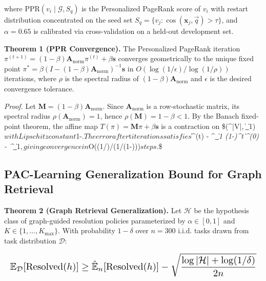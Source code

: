 \documentclass[10pt,journal,compsoc,twocolumn]{IEEEtran}
\begin{document}
where $\text{PPR}(v_i \mid \mathcal{G}, S_q)$ is the Personalized PageRank score of $v_i$ with restart distribution concentrated on the seed set $S_q = \{v_j : \cos(\mathbf{x}_j, \vec{q}) > \tau\}$, and $\alpha = 0.65$ is calibrated via cross-validation on a held-out development set.

\textbf{Theorem 1 (PPR Convergence).} The Personalized PageRank iteration $\pi^{(t+1)} = (1-\beta) \mathbf{A}_{\text{norm}} \pi^{(t)} + \beta \mathbf{s}$ converges geometrically to the unique fixed point $\pi^* = \beta(I - (1-\beta)\mathbf{A}_{\text{norm}})^{-1}\mathbf{s}$ in $O(\log(1/\epsilon) / \log(1/\rho))$ iterations, where $\rho$ is the spectral radius of $(1-\beta)\mathbf{A}_{\text{norm}}$ and $\epsilon$ is the desired convergence tolerance.

\textit{Proof.} Let $\mathbf{M} = (1-\beta)\mathbf{A}_{\text{norm}}$. Since $\mathbf{A}_{\text{norm}}$ is a row-stochastic matrix, its spectral radius $\rho(\mathbf{A}_{\text{norm}}) = 1$, hence $\rho(\mathbf{M}) = 1-\beta < 1$. By the Banach fixed-point theorem, the affine map $T(\pi) = \mathbf{M}\pi + \beta\mathbf{s}$ is a contraction on \$(^{|V|}, \|\cdot\|\_1)$ with Lipschitz constant $1-\beta$. The error after $t$ iterations satisfies $\|\pi^{(t)} - \pi^\textit{\|\_1 \leq (1-\beta)^t \|\pi^{(0)} - \pi^}\|\_1$, giving convergence in $O(\log(1/\epsilon)/\log(1/(1-\beta)))$ steps. $\square\$


\subsection{PAC-Learning Generalization Bound for Graph Retrieval}


\textbf{Theorem 2 (Graph Retrieval Generalization).} Let $\mathcal{H}$ be the hypothesis class of graph-guided resolution policies parameterized by $\alpha \in [0,1]$ and $K \in \{1,\ldots,K_{\max}\}$. With probability $1-\delta$ over $n = 300$ i.i.d. tasks drawn from task distribution $\mathcal{D}$:














\begin{equation}
\resizebox{\columnwidth}{!}{$\displaystyle
\begin{aligned}
\mathbb{E}_{\mathcal{D}}[\text{Resolved}(h)] \geq \hat{\mathbb{E}}_n[\text{Resolved}(h)] - \sqrt{\frac{\log|\mathcal{H}| + \log(1/\delta)}{2n}}
\end{aligned}
$}
\end{equation}
\end{document}
